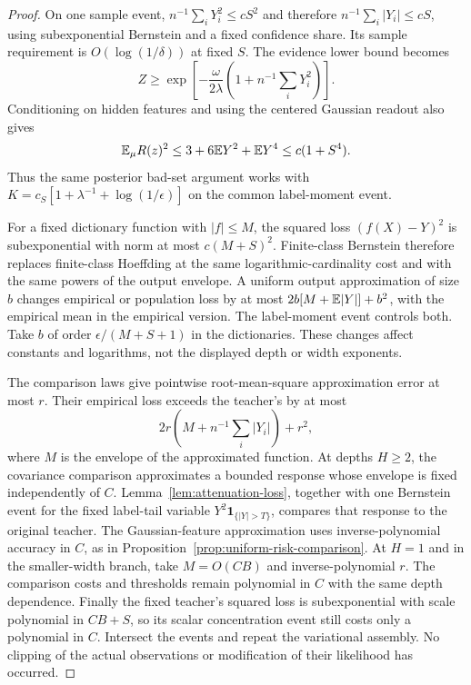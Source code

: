 \begin{proof}
On one sample event, $n^{-1}\sum_iY_i^2\le cS^2$ and therefore $n^{-1}\sum_i|Y_i|\le cS$, using subexponential Bernstein and a fixed confidence share. Its sample requirement is $O(\log(1/\delta))$ at fixed $S$.
The evidence lower bound becomes
\[
 Z\ge\exp\left[-\frac{\omega}{2\lambda}
                     \left(1+n^{-1}\sum_iY_i^2\right)\right].
\]
Conditioning on hidden features and using the centered Gaussian readout also gives
\[
 \mathbb E_\mu R(z)^2\le3+6\mathbb E Y^2+\mathbb E Y^4\le c(1+S^4).
\]
Thus the same posterior bad-set argument works with
$K=c_S[1+\lambda^{-1}+\log(1/\epsilon)]$ on the common label-moment event.

For a fixed dictionary function with $|f|\le M$, the squared loss $(f(X)-Y)^2$ is subexponential with norm at most $c(M+S)^2$. Finite-class Bernstein therefore replaces finite-class Hoeffding at the same logarithmic-cardinality cost and with the same powers of the output envelope. A uniform output approximation of size $b$ changes empirical or population loss by at most
$2b[M+\mathbb E|Y|]+b^2$, with the empirical mean in the empirical version. The label-moment event controls both. Take $b$ of order $\epsilon/(M+S+1)$ in the dictionaries. These changes affect constants and logarithms, not the displayed depth or width exponents.

The comparison laws give pointwise root-mean-square approximation error at most $r$. Their empirical loss exceeds the teacher's by at most
\[
 2r\left(M+n^{-1}\sum_i|Y_i|\right)+r^2,
\]
where $M$ is the envelope of the approximated function. At depths $H\ge2$, the covariance comparison approximates a bounded response whose envelope is fixed independently of $C$. Lemma~\ref{lem:attenuation-loss}, together with one Bernstein event for the fixed label-tail variable $Y^2\mathbf1_{\{|Y|>T\}}$, compares that response to the original teacher. The Gaussian-feature approximation uses inverse-polynomial accuracy in $C$, as in Proposition~\ref{prop:uniform-risk-comparison}. At $H=1$ and in the smaller-width branch, take $M=O(CB)$ and inverse-polynomial $r$. The comparison costs and thresholds remain polynomial in $C$ with the same depth dependence. Finally the fixed teacher's squared loss is subexponential with scale polynomial in $CB+S$, so its scalar concentration event still costs only a polynomial in $C$. Intersect the events and repeat the variational assembly. No clipping of the actual observations or modification of their likelihood has occurred.
\end{proof}
